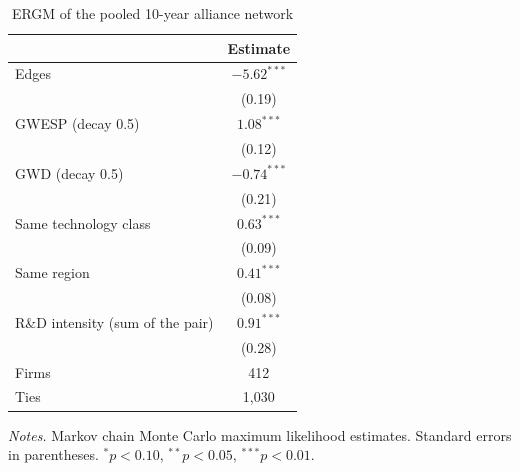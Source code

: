 \documentclass[12pt]{article}
\begin{document}
\begin{table}[h]
\centering
\begin{threeparttable}
\caption{ERGM of the pooled 10-year alliance network}
\label{tab:ergm}
\small
\singlespacing
\begin{tabular}{lc}
\toprule
 & Estimate \\
\midrule
Edges & $-5.62^{***}$ \\
 & (0.19) \\
GWESP (decay 0.5) & $1.08^{***}$ \\
 & (0.12) \\
GWD (decay 0.5) & $-0.74^{***}$ \\
 & (0.21) \\
Same technology class & $0.63^{***}$ \\
 & (0.09) \\
Same region & $0.41^{***}$ \\
 & (0.08) \\
R\&D intensity (sum of the pair) & $0.91^{***}$ \\
 & (0.28) \\
\midrule
Firms & 412 \\
Ties & 1,030 \\
\bottomrule
\end{tabular}
\begin{tablenotes}
\footnotesize
\item \textit{Notes.} Markov chain Monte Carlo maximum likelihood estimates. Standard errors in parentheses. $^{*}p<0.10$, $^{**}p<0.05$, $^{***}p<0.01$.
\end{tablenotes}
\end{threeparttable}
\end{table}
\end{document}
